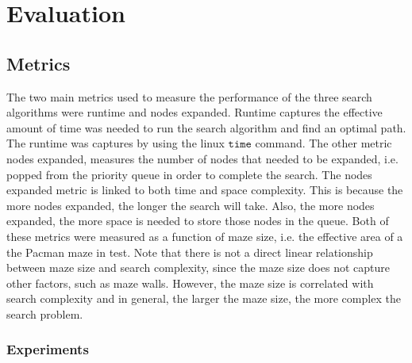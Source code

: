 

\section{Evaluation}\label{sec:eval}
	\subsection{Metrics}
    The two main metrics used to measure the performance of the three search algorithms were runtime and nodes expanded. Runtime captures the effective amount of time was needed to run the search algorithm and find an optimal path. The runtime was captures by using the linux $\texttt{time}$ command. The other metric nodes expanded, measures the number of nodes that needed to be expanded, i.e. popped from the priority queue in order to complete the search. The nodes expanded metric is linked to both time and space complexity. This is because the more nodes expanded, the longer the search will take. Also, the more nodes expanded, the more space is needed to store those nodes in the queue. Both of these metrics were measured as a function of maze size, i.e. the effective area of a the Pacman maze in test. Note that there is not a direct linear relationship between maze size and search complexity, since the maze size does not capture other factors, such as maze walls. However, the maze size is correlated with search complexity and in general, the larger the maze size, the more complex the search problem.
    
    \subsubsection{Experiments}